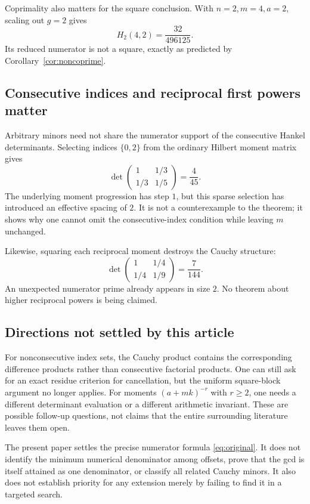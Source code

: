\documentclass[11pt,a4paper]{article}
\numberwithin{equation}{section}
\theoremstyle{definition}
\theoremstyle{remark}
\begin{document}
Coprimality also matters for the square conclusion. With $n=2,m=4,a=2$, scaling out $g=2$ gives
\[
 H_2(4,2)=\frac{32}{496125}.
\]
Its reduced numerator is not a square, exactly as predicted by Corollary~\ref{cor:noncoprime}.

\subsection{Consecutive indices and reciprocal first powers matter}
Arbitrary minors need not share the numerator support of the consecutive Hankel determinants. Selecting indices $\{0,2\}$ from the ordinary Hilbert moment matrix gives
\[
 \det\begin{pmatrix}1&1/3\\1/3&1/5\end{pmatrix}=\frac4{45}.
\]
The underlying moment progression has step $1$, but this sparse selection has introduced an effective spacing of $2$. It is not a counterexample to the theorem; it shows why one cannot omit the consecutive-index condition while leaving $m$ unchanged.

Likewise, squaring each reciprocal moment destroys the Cauchy structure:
\[
 \det\begin{pmatrix}1&1/4\\1/4&1/9\end{pmatrix}=\frac7{144}.
\]
An unexpected numerator prime already appears in size $2$. No theorem about higher reciprocal powers is being claimed.

\subsection{Directions not settled by this article}
For nonconsecutive index sets, the Cauchy product contains the corresponding difference products rather than consecutive factorial products. One can still ask for an exact residue criterion for cancellation, but the uniform square-block argument no longer applies. For moments $(a+mk)^{-r}$ with $r\geq2$, one needs a different determinant evaluation or a different arithmetic invariant. These are possible follow-up questions, not claims that the entire surrounding literature leaves them open.

The present paper settles the precise numerator formula \eqref{eq:original}. It does not identify the minimum numerical denominator among offsets, prove that the gcd is itself attained as one denominator, or classify all related Cauchy minors. It also does not establish priority for any extension merely by failing to find it in a targeted search.
\end{document}
